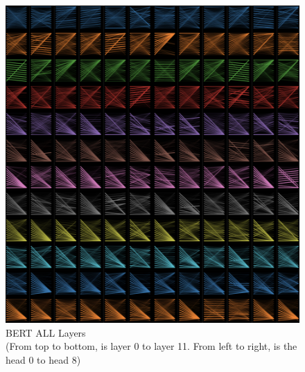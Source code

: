 \documentclass[fyp]{socreport}
\begin{document}
\begin{figure}[h]
    \centering
    \includegraphics[width=\linewidth]{./image/bert_all.png}
    \caption{BERT ALL Layers\\
    (From top to bottom, is layer 0 to layer 11. From left to right, is the head 0 to head 8)}
  \label{bert_all}
\end{figure}
\end{document}
